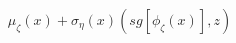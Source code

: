 \documentclass[preview]{standalone}
\begin{document}
\begin{align*}
\mu_{\zeta}(x) + \sigma_{\eta}(x) (sg[\phi_\zeta (x)],z)
\end{align*}
\end{document}
